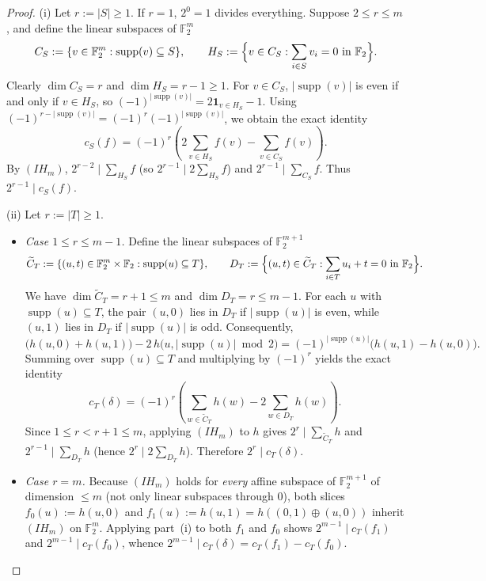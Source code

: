 \documentclass[11pt,a4paper]{article}
\theoremstyle{plain}
\theoremstyle{definition}
\theoremstyle{remark}
\newcommand{\F}{\mathbb{F}}
\newcommand{\supp}{\operatorname{supp}}
\newcommand{\abs}[1]{\lvert#1\rvert}
\newcommand{\indic}[1]{\mathbf{1}_{#1}}
\numberwithin{equation}{section}
\begin{document}
\begin{proof}
(i) Let $r := \abs{S} \ge 1$. If $r = 1$, $2^0 = 1$ divides everything. Suppose $2 \le r \le m$, and define the linear subspaces of $\F_2^m$
\[
  C_S := \{v \in \F_2^m : \supp(v) \subseteq S\}, \qquad
  H_S := \Bigl\{v \in C_S : \sum_{i \in S} v_i = 0 \text{ in } \F_2\Bigr\}.
\]
Clearly $\dim C_S = r$ and $\dim H_S = r - 1 \ge 1$. For $v \in C_S$, $\abs{\supp(v)}$ is even if and only if $v \in H_S$, so $(-1)^{\abs{\supp(v)}} = 2\indic{v \in H_S} - 1$. Using $(-1)^{r - \abs{\supp(v)}} = (-1)^r (-1)^{\abs{\supp(v)}}$, we obtain the exact identity
\[
  c_S(f) = (-1)^r \left(2 \sum_{v \in H_S} f(v) - \sum_{v \in C_S} f(v)\right).
\]
By $(IH_m)$, $2^{r-2} \mid \sum_{H_S} f$ (so $2^{r-1} \mid 2\sum_{H_S} f$) and $2^{r-1} \mid \sum_{C_S} f$. Thus $2^{r-1} \mid c_S(f)$.

(ii) Let $r := \abs{T} \ge 1$.
\begin{itemize}[leftmargin=1.8em]
  \item \emph{Case $1 \le r \le m - 1$.} Define the linear subspaces of $\F_2^{m+1}$
  \[
    \widetilde{C}_T := \{(u, t) \in \F_2^m \times \F_2 : \supp(u) \subseteq T\}, \qquad
    D_T := \Bigl\{(u, t) \in \widetilde{C}_T : \sum_{i \in T} u_i + t = 0 \text{ in } \F_2\Bigr\}.
  \]
  We have $\dim \widetilde{C}_T = r + 1 \le m$ and $\dim D_T = r \le m - 1$. For each $u$ with $\supp(u) \subseteq T$, the pair $(u, 0)$ lies in $D_T$ if $\abs{\supp(u)}$ is even, while $(u, 1)$ lies in $D_T$ if $\abs{\supp(u)}$ is odd. Consequently,
  \[
    \bigl(h(u, 0) + h(u, 1)\bigr) - 2\,h\bigl(u, \abs{\supp(u)} \bmod 2\bigr)
    = (-1)^{\abs{\supp(u)}}\bigl(h(u, 1) - h(u, 0)\bigr).
  \]
  Summing over $\supp(u) \subseteq T$ and multiplying by $(-1)^r$ yields the exact identity
  \[
    c_T(\delta) = (-1)^r \left(\sum_{w \in \widetilde{C}_T} h(w) - 2 \sum_{w \in D_T} h(w)\right).
  \]
  Since $1 \le r < r + 1 \le m$, applying $(IH_m)$ to $h$ gives $2^r \mid \sum_{\widetilde{C}_T} h$ and $2^{r-1} \mid \sum_{D_T} h$ (hence $2^r \mid 2\sum_{D_T} h$). Therefore $2^r \mid c_T(\delta)$.
  \item \emph{Case $r = m$.} Because $(IH_m)$ holds for \emph{every} affine subspace of $\F_2^{m+1}$ of dimension $\le m$ (not only linear subspaces through $0$), both slices $f_0(u) := h(u, 0)$ and $f_1(u) := h(u, 1) = h((0,1) \oplus (u,0))$ inherit $(IH_m)$ on $\F_2^m$. Applying part~(i) to both $f_1$ and $f_0$ shows $2^{m-1} \mid c_T(f_1)$ and $2^{m-1} \mid c_T(f_0)$, whence $2^{m-1} \mid c_T(\delta) = c_T(f_1) - c_T(f_0)$. \qedhere
\end{itemize}
\end{proof}
\end{document}
